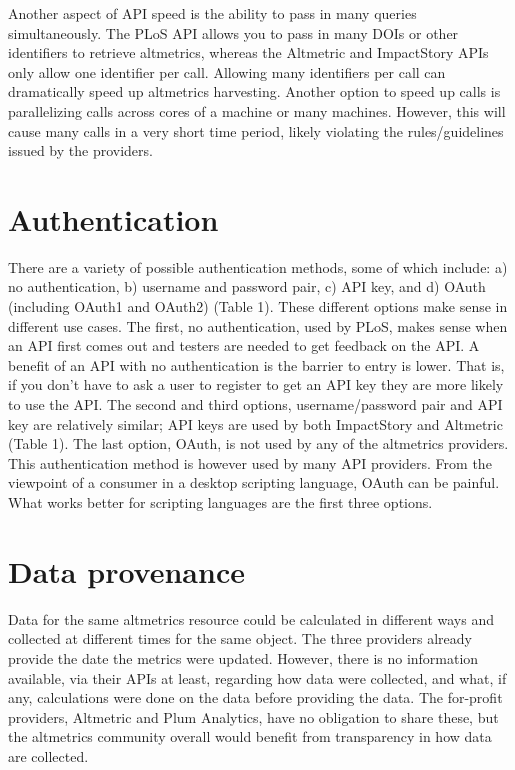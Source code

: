 \documentclass[letterpaper,superscriptaddress,showkeys,longbibliography]{revtex4-1}
\begin{document}
Another aspect of API speed is the ability to pass in many queries simultaneously. The PLoS API allows you to pass in many DOIs or other identifiers to retrieve altmetrics, whereas the Altmetric and ImpactStory APIs only allow one identifier per call. Allowing many identifiers per call can dramatically speed up altmetrics harvesting. Another option to speed up calls is parallelizing calls across cores of a machine or many machines.  However, this will cause many calls in a very short time period, likely violating the rules/guidelines issued by the providers.


\section{Authentication}

There are a variety of possible authentication methods, some of which include: a) no authentication, b) username and password pair, c) API key, and d) OAuth (including OAuth1 and OAuth2) (Table 1). These different options make sense in different use cases. The first, no authentication, used by PLoS, makes sense when an API first comes out and testers are needed to get feedback on the API. A benefit of an API with no authentication is the barrier to entry is lower. That is, if you don't have to ask a user to register to get an API key they are more likely to use the API. The second and third options, username/password pair and API key are relatively similar; API keys are used by both ImpactStory and Altmetric (Table 1). The last option, OAuth, is not used by any of the altmetrics providers. This authentication method is however used by many API providers. From the viewpoint of a consumer in a desktop scripting language, OAuth can be painful. What works better for scripting languages are the first three options.  

\section{Data provenance}

Data for the same altmetrics resource could be calculated in different ways and collected at different times for the same object. The three providers already provide the date the metrics were updated. However, there is no information available, via their APIs at least, regarding how data were collected, and what, if any, calculations were done on the data before providing the data. The for-profit providers, Altmetric and Plum Analytics, have no obligation to share these, but the altmetrics community overall would benefit from transparency in how data are collected. 
\end{document}
